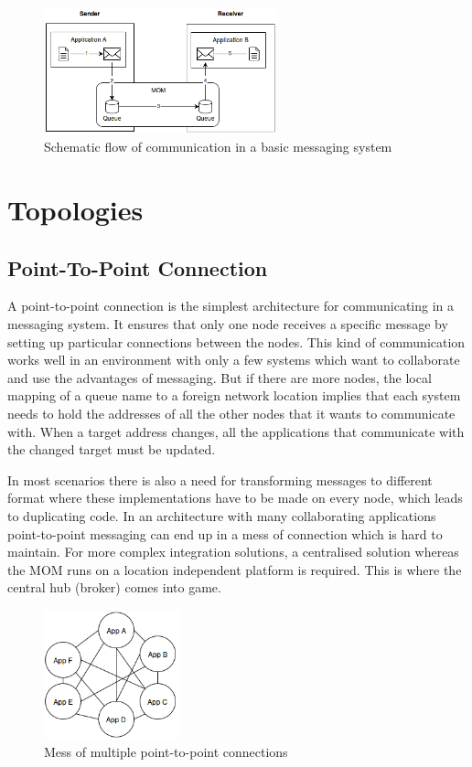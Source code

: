 \begin{figure}[H]
    \centering
    \includegraphics[width=0.6\textwidth]{images/mom-schema.png}
    \caption{Schematic flow of communication in a basic messaging system }
    \label{fig:message-oriented-middleware}
\end{figure}

\section{Topologies}
\subsection{Point-To-Point Connection}
\label{intro-messaging-pointtopoint}
A point-to-point connection is the simplest architecture for communicating in a
messaging system. It ensures that only one node receives a specific message by
setting up particular connections between the nodes. This kind of
communication works well in an environment with only a few systems which want to
collaborate and use the advantages of messaging. But if there are more
nodes, the local mapping of a queue name to a foreign network location
implies that each system needs to hold the addresses of all the other nodes that it
wants to communicate with. When a target address changes, all the applications that
communicate with the changed target must be updated. 

In most scenarios there is also a need for transforming messages to different
format where these implementations have to be made on every node, which leads to
duplicating code. In an architecture with many collaborating applications
point-to-point messaging can end up in a mess of connection which is hard to
maintain.  For more complex integration solutions, a centralised solution
whereas the MOM runs on a location independent platform is required. This is
where the central hub (broker) comes into game. \cite{MSDNIntegration}

\begin{figure}[H]
    \centering
    \includegraphics[width=0.35\textwidth]{images/point-to-point-messaging.png}
    \caption{Mess of multiple point-to-point connections}
    \label{fig:point-to-point-messaging}
\end{figure}

